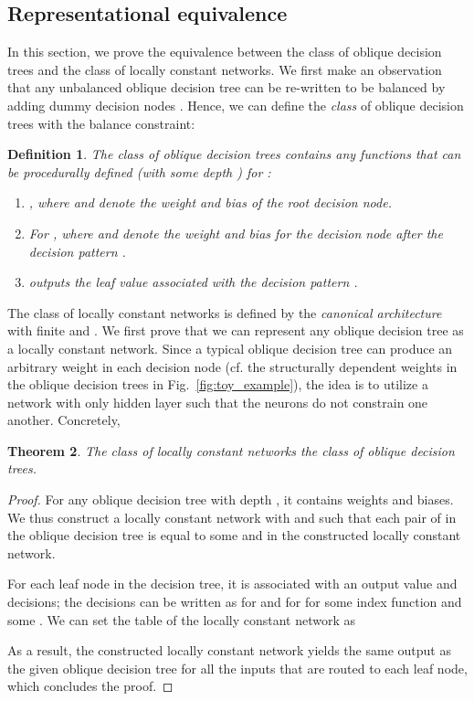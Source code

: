 \documentclass{article} \usepackage{iclr2020_conference,times}
\newtheorem{theorem}{Theorem}\newtheorem{definition}[theorem]{Definition}
\begin{document}
\subsection{Representational equivalence}\label{sec:repr-theory}

In this section, we prove the equivalence between the class of oblique decision trees and the class of locally constant networks. We first make an observation that any unbalanced oblique decision tree can be re-written to be balanced by adding dummy decision nodes . 
Hence, we can define the \emph{class} of oblique decision trees with the balance constraint:
\begin{definition}
The class of oblique decision trees contains any functions that can be procedurally defined (with some depth ) for :
\begin{enumerate}
\vspace{-2mm}
    \item , where  and  denote the weight and bias of the root decision node.
\vspace{-1.5mm}
    \item For , where  and  denote the weight and bias for the decision node after the decision pattern .
\vspace{-1.5mm}
    \item  outputs the leaf value  associated with the decision pattern . \!\!\!\!\!
\vspace{-2mm}
\end{enumerate}
\end{definition}
The class of locally constant networks is defined by the \emph{canonical architecture} with finite  and . We first prove that we can represent any oblique decision tree as a locally constant network. Since a typical oblique decision tree can produce an arbitrary weight in each decision node (cf. the structurally dependent weights in the oblique decision trees in Fig.~\ref{fig:toy_example}), the idea is to utilize a network with only  hidden layer such that the neurons do not constrain one another. Concretely,
\begin{theorem}
The class of locally constant networks  the class of oblique decision trees. 
\end{theorem}
\vspace{-4mm}
\begin{proof}
For any oblique decision tree with depth , it contains  weights and biases. We thus construct a locally constant network with  and  such that each pair of  in the oblique decision tree is equal to some  and  in the constructed locally constant network. 

For each leaf node in the decision tree, it is associated with an output value  and  decisions; the decisions can be written as  for  and  for  for some index function  and some . We can set the table  of the locally constant network as

As a result, the constructed locally constant network yields the same output as the given oblique decision tree for all the inputs that are routed to each leaf node, which concludes the proof. 
\end{proof}
\end{document}
